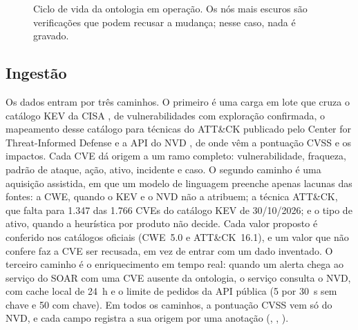 \begin{figure}[ht]
\centering
{}
\caption{Ciclo de vida da ontologia em operação. Os nós mais escuros são verificações que podem recusar a mudança; nesse caso, nada é gravado.}
\label{fig:ciclo}
\end{figure}

\subsection{Ingestão}

Os dados entram por três caminhos. O primeiro é uma carga em lote que cruza o catálogo KEV da CISA \cite{cisakev}, de vulnerabilidades com exploração confirmada, o mapeamento desse catálogo para técnicas do ATT\&CK publicado pelo Center for Threat-Informed Defense \cite{ctidkev,strom2018attack} e a API do NVD \cite{nvd}, de onde vêm a pontuação CVSS e os impactos. Cada CVE dá origem a um ramo completo: vulnerabilidade, fraqueza, padrão de ataque, ação, ativo, incidente e caso. O segundo caminho é uma aquisição assistida, em que um modelo de linguagem preenche apenas lacunas das fontes: a CWE, quando o KEV e o NVD não a atribuem; a técnica ATT\&CK, que falta para 1.347 das 1.766 CVEs do catálogo KEV de 30/10/2026; e o tipo de ativo, quando a heurística por produto não decide. Cada valor proposto é conferido nos catálogos oficiais (CWE~5.0 \cite{cwe} e ATT\&CK~16.1), e um valor que não confere faz a CVE ser recusada, em vez de entrar com um dado inventado. O terceiro caminho é o enriquecimento em tempo real: quando um alerta chega ao serviço do SOAR com uma CVE ausente da ontologia, o serviço consulta o NVD, com cache local de 24~h e o limite de pedidos da API pública (5 por 30~s sem chave e 50 com chave). Em todos os caminhos, a pontuação CVSS vem só do NVD, e cada campo registra a sua origem por uma anotação (, , ).

